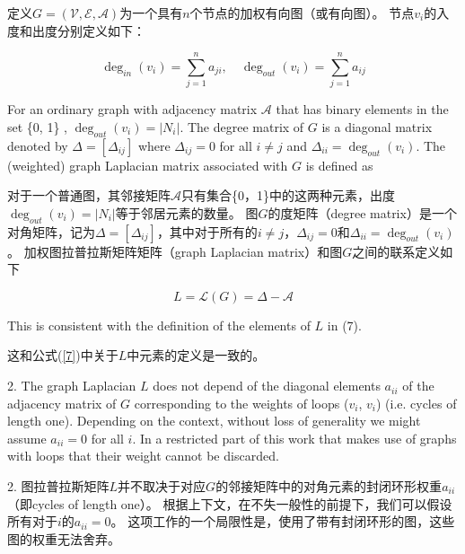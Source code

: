 \documentclass{article}
\begin{document}
定义$G=(\mathcal{V}, \mathcal{E}, \mathcal{A})$为一个具有$n$个节点的加权有向图（或有向图）。
节点$v_i$的入度和出度分别定义如下：

\begin{equation}
    \deg_{in}(v_i) = \sum_{j=1}^{n}a_{ji},\quad \deg_{out}(v_i) = \sum_{j=1}^{n}a_{ij}
    \tag{11}
    \label{11}
\end{equation}

{\color[gray]{0.5}
\noindent For an ordinary graph with adjacency matrix $\mathcal{A}$ that has binary elements in the set \{0, 1\} , $\deg_{out}(v_i) = |N_i|$. 
The degree matrix of $G$ is a diagonal matrix denoted by $\Delta=[\Delta_{ij}]$ where $\Delta_{ij}=0$ for all $i\ne j$ and $\Delta_{ii}=\deg_{out}(v_i)$. 
The (weighted) graph Laplacian matrix associated with $G$ is deﬁned as
}

\noindent 对于一个普通图，其邻接矩阵$\mathcal{A}$只有集合\{0，1\}中的这两种元素，出度$\deg_{out}(v_i) = |N_i|$等于邻居元素的数量。
图$G$的度矩阵（degree matrix）是一个对角矩阵，记为$\Delta=[\Delta_{ij}]$，其中对于所有的$i\ne j$，$\Delta_{ij}=0$和$\Delta_{ii}=\deg_{out}(v_i)$。
加权图拉普拉斯矩阵矩阵（graph Laplacian matrix）和图$G$之间的联系定义如下

\begin{equation}
    L = \mathcal{L}(G) = \Delta-\mathcal{A}
    \tag{12}
    \label{12}
\end{equation}


{\color[gray]{0.5}
\noindent This is consistent with the deﬁnition of the elements of $L$ in (7).
}

\noindent 这和公式(\ref{7})中关于$L$中元素的定义是一致的。

{\color[gray]{0.5}
 2. The graph Laplacian $L$ does not depend of the diagonal elements $a_{ii}$ of the adjacency matrix of $G$ corresponding to the weights of loops ($v_i$, $v_i$) (i.e. cycles of length one). 
Depending on the context, without loss of generality we might assume $a_{ii}=0$ for all $i$. 
In a restricted part of this work that makes use of graphs with loops that their weight cannot be discarded.
}

 2. 图拉普拉斯矩阵$L$并不取决于对应$G$的邻接矩阵中的对角元素的封闭环形权重$a_{ii}$（即cycles of length one）。
根据上下文，在不失一般性的前提下，我们可以假设所有对于$i$的$a_{ii}=0$。
这项工作的一个局限性是，使用了带有封闭环形的图，这些图的权重无法舍弃。
\end{document}
